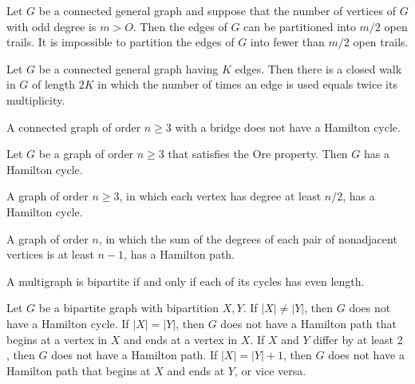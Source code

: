\begin{theorem}
  \label{thm:11.2.4}
  Let $G$ be a connected general graph and suppose that the number of vertices of $G$ with odd 
  degree is $m > O$. Then the edges of $G$ can be partitioned into $m/2$ open trails. It is 
  impossible to partition the edges of $G$ into fewer than $m/2$ open trails.
\end{theorem}

\begin{theorem}
  \label{thm:11.2.5}
  Let $G$ be a connected general graph having $K$ edges. Then there is a closed walk in $G$ of 
  length $2K$ in which the number of times an edge is used equals twice its multiplicity.
\end{theorem}

\begin{theorem}
  \label{thm:11.3.1}
  A connected graph of order $n \geq 3$ with a bridge does not have a Hamilton cycle.
\end{theorem}

\begin{theorem}
  \label{thm:11.3.2}
  Let $G$ be a graph of order $n \geq 3$ that satisfies the Ore property. Then $G$ has a Hamilton 
  cycle.
\end{theorem}

\begin{corollary}
  \label{cor:11.3.3}
  A graph of order $n \geq 3$, in which each vertex has degree at least $n/2$, has a Hamilton cycle.

\end{corollary}

\begin{theorem}
  \label{thm:11.3.4}
  A graph of order $n$, in which the sum of the degrees of each pair of nonadjacent vertices is at 
  least $n - 1$, has a Hamilton path.
\end{theorem}

\begin{theorem}
  \label{thm:11.4.1}
  A multigraph is bipartite if and only if each of its cycles has even length.
\end{theorem}

\begin{theorem}
  \label{thm:11.4.2}
  Let $G$ be a bipartite graph with bipartition $X, Y$. If $|X| \neq|Y|$, then $G$ does not have a 
  Hamilton cycle. If $|X|=|Y|$, then $G$ does not have a Hamilton path that begins at a vertex in 
  $X$ and ends at a vertex in $X$. If $X$ and $Y$ differ by at least 2 , then $G$ does not have a 
  Hamilton path. If $|X|=|Y|+1$, then $G$ does not have a Hamilton path that begins at $X$ and ends 
  at $Y$, or vice versa.
\end{theorem}

